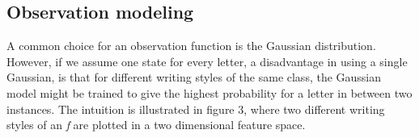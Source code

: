 \documentclass[conference]{IEEEtran}
\begin{document}
\subsection{Observation modeling}\label{GMM}
A common choice for an observation function is the Gaussian distribution. However, if we assume one state for every letter, a disadvantage in using a single Gaussian, is that for different writing styles of the same class, the Gaussian model might be trained to give the highest probability for a letter in between two instances. The intuition is illustrated in figure 3, where two different writing styles of an {\it f} are plotted in a two dimensional feature space.
\begin{figure}[ht]
  \centering
\end{figure}
\end{document}
